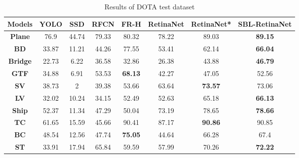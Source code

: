 \documentclass[conference]{IEEEtran}
\begin{document}
	\begin{table}[t]
	  \caption{Results of DOTA test dataset}
      \centering
      \begin{tabular}{cccccccc}
      \hline

\textbf{Models} & \textbf{YOLO\cite{redmon2017yolo9000}} & \textbf{SSD\cite{liu2016ssd}} & \textbf{RFCN\cite{dai2016r}} & \textbf{FR-H\cite{ren2015faster}}  & \textbf{RetinaNet\cite{lin2017focal}} & \textbf{RetinaNet*} & \textbf{SBL-RetinaNet} \\ \hline
\textbf{Plane}  & 76.9          & 44.74        & 79.33         & 80.32          & 78.22              & 89.03               & \textbf{89.15}         \\
\textbf{BD}     & 33.87         & 11.21        & 44.26         & 77.55          & 53.41              & 62.14               & \textbf{66.04}         \\
\textbf{Bridge} & 22.73         & 6.22         & 36.58         & 32.86          & 26.38              & 43.88               & \textbf{46.79}         \\
\textbf{GTF}    & 34.88         & 6.91         & 53.53         & \textbf{68.13} & 42.27              & 47.05               & 52.56                  \\
\textbf{SV}     & 38.73         & 2            & 39.38         & 53.66          & 63.64              & \textbf{73.57}      & 73.06                  \\
\textbf{LV}     & 32.02         & 10.24        & 34.15         & 52.49          & 52.63              & 65.18               & \textbf{66.13}         \\
\textbf{Ship}   & 52.37         & 11.34        & 47.29         & 50.04          & 73.19              & 78.65               & \textbf{78.66}         \\
\textbf{TC}     & 61.65         & 15.59        & 45.66         & 90.41          & 87.17              & \textbf{90.86}      & 90.85                  \\
\textbf{BC}     & 48.54         & 12.56        & 47.74         & \textbf{75.05} & 44.64              & 66.28               & 67.4                   \\
\textbf{ST}     & 33.91         & 17.94        & 65.84         & 59.59          & 57.99              & 70.26               & \textbf{72.22}         \\

\end{tabular}
\end{table}
\end{document}
